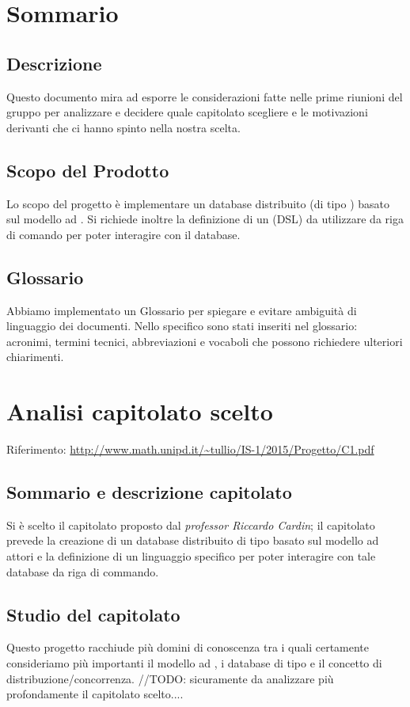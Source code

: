 \documentclass{scalatekids-article}
\begin{document}
\section{Sommario}
\subsection{Descrizione}
Questo documento mira ad esporre le considerazioni fatte nelle prime riunioni
del gruppo per analizzare e decidere quale capitolato scegliere e le motivazioni
derivanti che ci hanno spinto nella nostra scelta.

\subsection{Scopo del Prodotto}
Lo scopo del progetto è implementare un database  distribuito (di
tipo ) basato sul modello ad . Si richiede inoltre
la definizione di un  (DSL) da utilizzare da riga
di comando per poter interagire con il database.
\subsection{Glossario}
Abbiamo implementato un Glossario per spiegare e evitare ambiguità di
linguaggio dei documenti. Nello specifico sono stati inseriti nel glossario:
acronimi, termini tecnici, abbreviazioni e vocaboli che possono richiedere
ulteriori chiarimenti.

\section{Analisi capitolato scelto}

Riferimento: \url{http://www.math.unipd.it/~tullio/IS-1/2015/Progetto/C1.pdf}\\

\subsection{Sommario e descrizione capitolato}
Si è scelto il capitolato proposto dal \textit{professor Riccardo Cardin}; il capitolato
prevede la creazione di un database  distribuito di tipo  basato
sul modello ad attori e la definizione di un linguaggio specifico per poter
interagire con tale database da riga di commando.

\subsection{Studio del capitolato}
Questo progetto racchiude più domini di conoscenza tra i quali certamente
consideriamo più importanti il modello ad , i database di tipo
 e il concetto di distribuzione/concorrenza.
//TODO: sicuramente da analizzare più profondamente il capitolato scelto....
\end{document}
